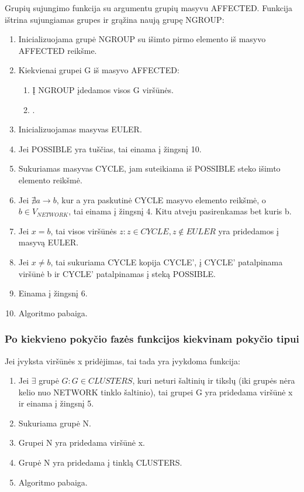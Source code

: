 Grupių sujungimo funkcija su argumentu grupių masyvu AFFECTED. Funkcija ištrina sujungiamas grupes ir grąžina naują grupę NGROUP:
\begin{enumerate}
	\item Inicializuojama grupė NGROUP su išimto pirmo elemento iš masyvo AFFECTED reikšme.
	\item Kiekvienai grupei G iš masyvo AFFECTED:
	\begin{enumerate}
		\item Į NGROUP įdedamos visos G viršūnės.
		\item .
	\end{enumerate}
	\item Inicializuojamas masyvas EULER.
	\item Jei POSSIBLE yra tuščias, tai einama į žingsnį 10.
	\item Sukuriamas masyvas CYCLE, jam suteikiama iš POSSIBLE steko išimto elemento reikšmė.
	\item Jei $\nexists a \rightarrow b$, kur a yra paskutinė CYCLE masyvo elemento reikšmė, o $b \in V_{NETWORK}$, tai einama į žingsnį 4. Kitu atveju pasirenkamas bet kuris b.
	\item Jei $x = b$, tai visos viršūnės $z : z \in CYCLE, z \notin EULER$ yra pridedamos į masyvą EULER.
	\item Jei $x \neq b$, tai sukuriama CYCLE kopija CYCLE', į CYCLE' patalpinama viršūnė b ir CYCLE' patalpinamas į steką POSSIBLE.
	\item Einama į žingsnį 6.
	\item Algoritmo pabaiga. 
\end{enumerate}

\subsubsection{Po kiekvieno pokyčio fazės funkcijos kiekvinam pokyčio tipui}

Jei įvyksta viršūnės x pridėjimas, tai tada yra įvykdoma funkcija:
\begin{enumerate}
	\item Jei $\exists$ grupė $G : G \in CLUSTERS$, kuri neturi šaltinių ir tikslų (iki grupės nėra kelio nuo NETWORK tinklo šaltinio), tai grupei G yra pridedama viršūnė x ir einama į žingsnį 5.
	\item Sukuriama grupė N.
	\item Grupei N  yra pridedama viršūnė x.
	\item Grupė N  yra pridedama į tinklą CLUSTERS.
	\item Algoritmo pabaiga. 
\end{enumerate}

